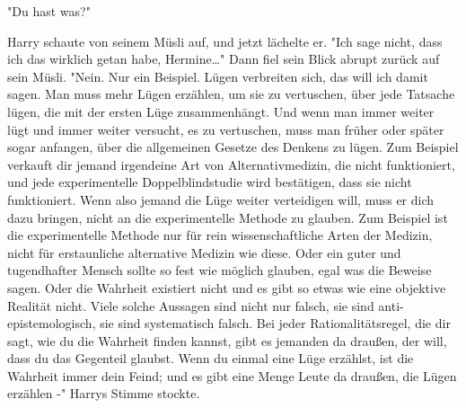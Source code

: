 {"Du hast was?"

Harry schaute von seinem Müsli auf, und jetzt lächelte er. "Ich sage nicht, dass ich das wirklich getan habe, Hermine…" Dann fiel sein Blick abrupt zurück auf sein Müsli. "Nein. Nur ein Beispiel. Lügen verbreiten sich, das will ich damit sagen. Man muss mehr Lügen erzählen, um sie zu vertuschen, über jede Tatsache lügen, die mit der ersten Lüge zusammenhängt. Und wenn man immer weiter lügt und immer weiter versucht, es zu vertuschen, muss man früher oder später sogar anfangen, über die allgemeinen Gesetze des Denkens zu lügen. Zum Beispiel verkauft dir jemand irgendeine Art von Alternativmedizin, die nicht funktioniert, und jede experimentelle Doppelblindstudie wird bestätigen, dass sie nicht funktioniert. Wenn also jemand die Lüge weiter verteidigen will, muss er dich dazu bringen, nicht an die experimentelle Methode zu glauben. Zum Beispiel ist die experimentelle Methode nur für rein wissenschaftliche Arten der Medizin, nicht für erstaunliche alternative Medizin wie diese. Oder ein guter und tugendhafter Mensch sollte so fest wie möglich glauben, egal was die Beweise sagen. Oder die Wahrheit existiert nicht und es gibt so etwas wie eine objektive Realität nicht. Viele solche Aussagen sind nicht nur falsch, sie sind anti-epistemologisch, sie sind systematisch falsch. Bei jeder Rationalitätsregel, die dir sagt, wie du die Wahrheit finden kannst, gibt es jemanden da draußen, der will, dass du das Gegenteil glaubst. Wenn du einmal eine Lüge erzählst, ist die Wahrheit immer dein Feind; und es gibt eine Menge Leute da draußen, die Lügen erzählen -" Harrys Stimme stockte.

}
